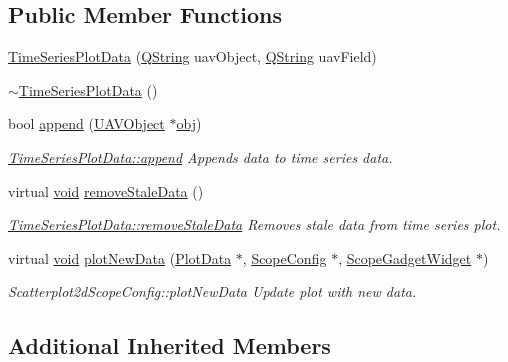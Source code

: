 \subsection*{Public Member Functions}
\begin{DoxyCompactItemize}
\item 
\hyperlink{group___scope_plugin_gaee4fb8258165729e7db0a3e37f619245}{Time\-Series\-Plot\-Data} (\hyperlink{group___u_a_v_objects_plugin_gab9d252f49c333c94a72f97ce3105a32d}{Q\-String} uav\-Object, \hyperlink{group___u_a_v_objects_plugin_gab9d252f49c333c94a72f97ce3105a32d}{Q\-String} uav\-Field)
\item 
\hyperlink{group___scope_plugin_gada4c361665eb2f78ad8768e8f25a9786}{$\sim$\-Time\-Series\-Plot\-Data} ()
\item 
bool \hyperlink{group___scope_plugin_ga35573edecad8799fae6df0ed2a47638a}{append} (\hyperlink{class_u_a_v_object}{U\-A\-V\-Object} $\ast$\hyperlink{glext_8h_a0c0d4701a6c89f4f7f0640715d27ab26}{obj})
\begin{DoxyCompactList}\small\item\em \hyperlink{group___scope_plugin_ga35573edecad8799fae6df0ed2a47638a}{Time\-Series\-Plot\-Data\-::append} Appends data to time series data. \end{DoxyCompactList}\item 
virtual \hyperlink{group___u_a_v_objects_plugin_ga444cf2ff3f0ecbe028adce838d373f5c}{void} \hyperlink{group___scope_plugin_gaed5772c910e2434ae0d99aee7d0fd829}{remove\-Stale\-Data} ()
\begin{DoxyCompactList}\small\item\em \hyperlink{group___scope_plugin_gaed5772c910e2434ae0d99aee7d0fd829}{Time\-Series\-Plot\-Data\-::remove\-Stale\-Data} Removes stale data from time series plot. \end{DoxyCompactList}\item 
virtual \hyperlink{group___u_a_v_objects_plugin_ga444cf2ff3f0ecbe028adce838d373f5c}{void} \hyperlink{group___scope_plugin_gab0866f798b0b322c20aa33e85a3a6296}{plot\-New\-Data} (\hyperlink{class_plot_data}{Plot\-Data} $\ast$, \hyperlink{class_scope_config}{Scope\-Config} $\ast$, \hyperlink{class_scope_gadget_widget}{Scope\-Gadget\-Widget} $\ast$)
\begin{DoxyCompactList}\small\item\em Scatterplot2d\-Scope\-Config\-::plot\-New\-Data Update plot with new data. \end{DoxyCompactList}\end{DoxyCompactItemize}
\subsection*{Additional Inherited Members}


